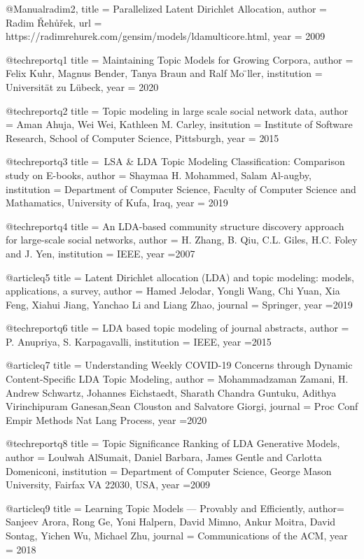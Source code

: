 \documentclass[german,version-2020-11]{uzl-thesis}
\begin{document}
\begin{bibtex-entries}
@Manual{radim2,
  title =        {Parallelized Latent Dirichlet Allocation},
  author =       {Radim Řehůřek},
  url =          {https://radimrehurek.com/gensim/models/ldamulticore.html},
  year =         {2009}
}

@techreport{q1
title = {Maintaining Topic Models for Growing Corpora},
author = {Felix Kuhr, Magnus Bender, Tanya Braun and Ralf Mo ̈ller},
institution = {Universität zu Lübeck}, 
year = {2020}}

@techreport{q2
title = {Topic modeling in large scale social network data},
author = {Aman Ahuja, Wei Wei, Kathleen M. Carley},
insitution = {Institute of Software Research, School of Computer Science, Pittsburgh},
year = {2015}
}

@techreport{q3
title = {LSA & LDA Topic Modeling Classification: Comparison study on E-books},
author = {Shaymaa H. Mohammed, Salam Al-augby},
institution = {Department of Computer Science, Faculty of Computer Science and Mathamatics, University of Kufa, Iraq},
year = {2019}}

@techreport{q4
title = {An LDA-based community structure discovery approach for large-scale social networks},
author = {H. Zhang, B. Qiu, C.L. Giles, H.C. Foley and J. Yen},
institution = {IEEE},
year ={2007}}

@article{q5
title = {Latent Dirichlet allocation (LDA) and topic modeling: models, applications, a survey},
author = {Hamed Jelodar, Yongli Wang, Chi Yuan, Xia Feng, Xiahui Jiang, Yanchao Li and Liang Zhao},
journal = {Springer},
year ={2019}}

@techreport{q6
title = {LDA based topic modeling of journal abstracts},
author = {P. Anupriya, S. Karpagavalli},
institution = {IEEE},
year ={2015}}

@article{q7
title = {Understanding Weekly COVID-19 Concerns through Dynamic Content-Specific LDA Topic Modeling},
author = {Mohammadzaman Zamani, H. Andrew Schwartz, Johannes Eichstaedt, Sharath Chandra Guntuku, Adithya Virinchipuram Ganesan,Sean Clouston and Salvatore Giorgi},
journal = {Proc Conf Empir Methods Nat Lang Process},
year ={2020}}

@techreport{q8
title = {Topic Significance Ranking of LDA Generative Models},
author = {Loulwah AlSumait, Daniel Barbara, James Gentle and Carlotta Domeniconi},
institution = {Department of Computer Science, George Mason University, Fairfax VA 22030, USA},
year ={2009}}

@article{q9
title = {Learning Topic Models — Provably and Efficiently},
author= {Sanjeev Arora, Rong Ge, Yoni Halpern, David Mimno, Ankur Moitra, David Sontag, Yichen Wu, Michael Zhu},
journal = {Communications of the ACM},
year = {2018}}


\end{bibtex-entries}
\end{document}
